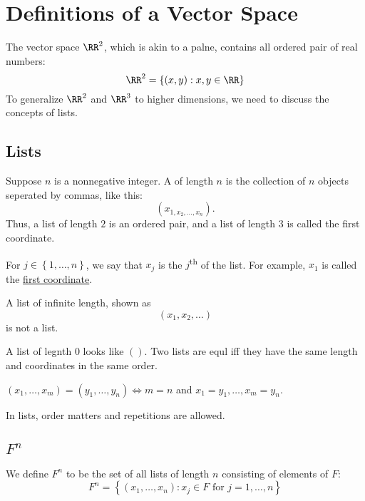\section{Definitions of a Vector Space}

The vector space $\RR^2$, which is akin to a palne, contains all ordered pair of real numbers:
\begin{equation*}
  \RR^2 = \left\{(x, y) : x, y \in \RR\right\}
\end{equation*}
To generalize $\RR^2$ and $\RR^{3}$ to higher dimensions, we need to discuss the concepts of lists.

\subsection{Lists}

\begin{definition}
  Suppose $n$ is a nonnegative integer. 
  A  of length $n$ is the collection of $n$ objects seperated by commas, like this:
  \begin{equation*}
    \left(x_{1, x_{2}, \dots, x_{n}}\right).
  \end{equation*}
  Thus, a list of length $2$ is an ordered pair, and a list of length $3$ is called the first coordinate.
\end{definition}

For $j \in \left\{1, \dots, n\right\}$, we say that $x_{j}$ is the $j$\textsuperscript{th}  of the list.
For example, $x_{1}$ is called the \underline{first coordinate}.

A list of infinite length, shown as 
\begin{equation*}
  \left(x_{1}, x_{2}, \dots\right)
\end{equation*}
is not a list.

A list of legnth $0$ looks like $()$. 
Two lists are equl iff they have the same length and coordinates in the same order.

\begin{example}
  $\left(x_{1}, \dots, x_{m}\right) = \left(y_{1}, \dots, y_{n}\right) \iff m = n$ and $x_{1} = y_{1}, \dots, x_{m} = y_{n}$.
\end{example}

In lists, order matters and repetitions are allowed. 

\subsection{\texorpdfstring{$F^{n}$}{Fn}}
\begin{definition}
  We define $F^{n}$ to be the set of all lists of length $n$ consisting of elements of $F$:
  \begin{equation*}
    F^{n} = \left\{(x_{1}, \dots, x_{n}) : x_{j} \in F \text{ for } j = 1, \dots, n\right\}
  \end{equation*}
\end{definition}

